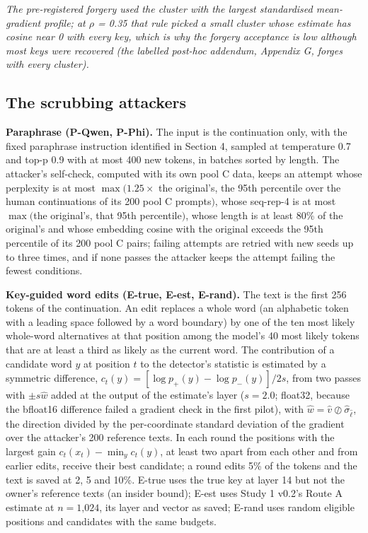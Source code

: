 \documentclass[11pt,letterpaper]{article}
\begin{document}
\emph{The pre-registered forgery used the cluster with the largest standardised mean-gradient profile; at \ensuremath{\rho} = 0.35 that rule picked a small cluster whose estimate has cosine near 0 with every key, which is why the forgery acceptance is low although most keys were recovered (the labelled post-hoc addendum, Appendix G, forges with every cluster).}

\hypertarget{the-scrubbing-attackers}{%
\subsection{The scrubbing attackers}\label{the-scrubbing-attackers}}

\textbf{Paraphrase (P-Qwen, P-Phi).} The input is the continuation only, with the fixed paraphrase instruction identified in Section 4, sampled at temperature 0.7 and top-p 0.9 with at most 400 new tokens, in batches sorted by length. The attacker's self-check, computed with its own pool C data, keeps an attempt whose perplexity is at most \(\max(1.25 \times\) the original's, the 95th percentile over the human continuations of its 200 pool C prompts\()\), whose seq-rep-4 is at most \(\max(\)the original's, that 95th percentile\()\), whose length is at least 80\% of the original's and whose embedding cosine with the original exceeds the 95th percentile of its 200 pool C pairs; failing attempts are retried with new seeds up to three times, and if none passes the attacker keeps the attempt failing the fewest conditions.

\textbf{Key-guided word edits (E-true, E-est, E-rand).} The text is the first 256 tokens of the continuation. An edit replaces a whole word (an alphabetic token with a leading space followed by a word boundary) by one of the ten most likely whole-word alternatives at that position among the model's 40 most likely tokens that are at least a third as likely as the current word. The contribution of a candidate word \(y\) at position \(t\) to the detector's statistic is estimated by a symmetric difference, \(c_t(y) = [\log p_+(y) - \log p_-(y)] / 2s\), from two passes with \(\pm s \hat w\) added at the output of the estimate's layer (\(s = 2.0\); float32, because the bfloat16 difference failed a gradient check in the first pilot), with \(\hat w = \hat v \oslash \hat\sigma_{\hat\ell}\), the direction divided by the per-coordinate standard deviation of the gradient over the attacker's 200 reference texts. In each round the positions with the largest gain \(c_t(x_t) - \min_y c_t(y)\), at least two apart from each other and from earlier edits, receive their best candidate; a round edits 5\% of the tokens and the text is saved at 2, 5 and 10\%. E-true uses the true key at layer 14 but not the owner's reference texts (an insider bound); E-est uses Study 1 v0.2's Route A estimate at \(n = \text{1,024}\), its layer and vector as saved; E-rand uses random eligible positions and candidates with the same budgets.
\end{document}
